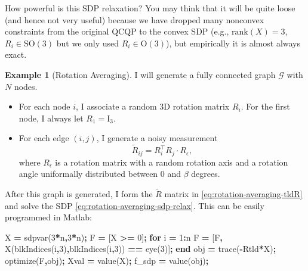 \documentclass[
]{book}
\newenvironment{Shaded}{\begin{snugshade}}{\end{snugshade}}
\newcommand{\FloatTok}[1]{\textcolor[rgb]{0.00,0.00,0.81}{#1}}
\newcommand{\KeywordTok}[1]{\textcolor[rgb]{0.13,0.29,0.53}{\textbf{#1}}}
\newcommand{\NormalTok}[1]{#1}
\newcommand{\OperatorTok}[1]{\textcolor[rgb]{0.81,0.36,0.00}{\textbf{#1}}}
\newcommand{\VariableTok}[1]{\textcolor[rgb]{0.00,0.00,0.00}{#1}}
\theoremstyle{definition}
\theoremstyle{definition}
\newtheorem{example}{Example}[chapter]
\theoremstyle{definition}
\theoremstyle{definition}
\theoremstyle{remark}
\begin{document}
How powerful is this SDP relaxation? You may think that it will be quite loose (and hence not very useful) because we have dropped many nonconvex constraints from the original QCQP to the convex SDP (e.g., \(\mathrm{rank}(X) = 3\), \(R_i \in \mathrm{SO}(3)\) but we only used \(R_i \in \mathrm{O}(3)\)), but empirically it is almost always exact.

\begin{example}[Rotation Averaging]
\protect\hypertarget{exm:RotationAveraging}{}\label{exm:RotationAveraging}I will generate a fully connected graph \(\mathcal{G}\) with \(N\) nodes.

\begin{itemize}
\item
  For each node \(i\), I associate a random 3D rotation matrix \(R_i\). For the first node, I always let \(R_1 = \mathrm{I}_3\).
\item
  For each edge \((i,j)\), I generate a noisy measurement
  \[
  \tilde{R}_{ij} = R_i^\top R_j \cdot R_\epsilon,
  \]
  where \(R_\epsilon\) is a rotation matrix with a random rotation axis and a rotation angle uniformally distributed between \(0\) and \(\beta\) degrees.
\end{itemize}

After this graph is generated, I form the \(\tilde{R}\) matrix in \eqref{eq:rotation-averaging-tldR} and solve the SDP \eqref{eq:rotation-averaging-sdp-relax}. This can be easily programmed in Matlab:

\begin{Shaded}
\begin{Highlighting}[]
\VariableTok{X} \OperatorTok{=} \VariableTok{sdpvar}\NormalTok{(}\FloatTok{3}\OperatorTok{*}\VariableTok{n}\OperatorTok{,}\FloatTok{3}\OperatorTok{*}\VariableTok{n}\NormalTok{)}\OperatorTok{;}
\VariableTok{F} \OperatorTok{=}\NormalTok{ [}\VariableTok{X} \OperatorTok{\textgreater{}=} \FloatTok{0}\NormalTok{]}\OperatorTok{;}
\KeywordTok{for} \VariableTok{i} \OperatorTok{=} \FloatTok{1}\OperatorTok{:}\VariableTok{n}
    \VariableTok{F} \OperatorTok{=}\NormalTok{ [}\VariableTok{F}\OperatorTok{,}
        \VariableTok{X}\NormalTok{(}\VariableTok{blkIndices}\NormalTok{(}\VariableTok{i}\OperatorTok{,}\FloatTok{3}\NormalTok{)}\OperatorTok{,}\VariableTok{blkIndices}\NormalTok{(}\VariableTok{i}\OperatorTok{,}\FloatTok{3}\NormalTok{)) }\OperatorTok{==} \VariableTok{eye}\NormalTok{(}\FloatTok{3}\NormalTok{)]}\OperatorTok{;}
\KeywordTok{end}
\VariableTok{obj} \OperatorTok{=} \VariableTok{trace}\NormalTok{(}\OperatorTok{{-}}\VariableTok{Rtld}\OperatorTok{*}\VariableTok{X}\NormalTok{)}\OperatorTok{;}
\VariableTok{optimize}\NormalTok{(}\VariableTok{F}\OperatorTok{,}\VariableTok{obj}\NormalTok{)}\OperatorTok{;}
\VariableTok{Xval} \OperatorTok{=} \VariableTok{value}\NormalTok{(}\VariableTok{X}\NormalTok{)}\OperatorTok{;}
\VariableTok{f\_sdp} \OperatorTok{=} \VariableTok{value}\NormalTok{(}\VariableTok{obj}\NormalTok{)}\OperatorTok{;}
\end{Highlighting}
\end{Shaded}


\end{example}
\end{document}

